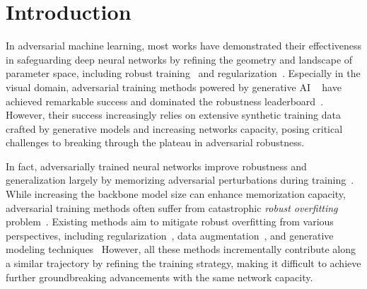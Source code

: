 

\section{Introduction}

In adversarial machine learning, most works have demonstrated their effectiveness in safeguarding deep neural networks by refining the geometry and landscape of parameter space, including robust training~\citep{madry2017towards,zhang2019theoretically,gowal2021improving} and regularization~\citep{cisse2017parseval,zheng2016improving}.
Especially in the visual domain, adversarial training methods
powered by generative AI ~\cite{wang2023better,gowal2021improving}
have achieved remarkable success and dominated the robustness leaderboard~\cite{croce2020robustbench}. 
However, their success increasingly relies on extensive synthetic training data crafted by generative models and increasing networks capacity, posing critical challenges to breaking through the plateau in adversarial robustness.




In fact, adversarially trained neural networks improve robustness and generalization largely by memorizing adversarial perturbations during training~\cite{madry2017towards}. While increasing the backbone model size can enhance memorization capacity, adversarial training methods often suffer from  catastrophic \emph{robust overfitting} problem~\cite{rice2020overfitting}. Existing methods aim to mitigate robust overfitting from various perspectives, including regularization~\cite{andriushchenko2020understanding,qin2019adversarial,sriramanan2020guided}, data augmentation~\cite{devries2017improved,zhang2017mixup,carmon2019unlabeled,zhai2019adversarially}, and generative modeling techniques~\cite{wang2023better,gowal2021improving}
However, all these methods incrementally contribute along a similar trajectory by refining the training strategy, making it difficult to achieve further groundbreaking advancements with the same network capacity.

